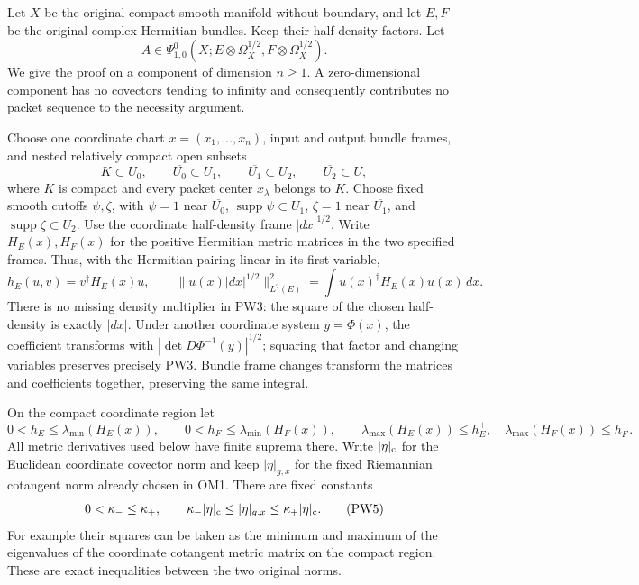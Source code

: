 \documentclass[
  11pt,
]{article}
\begin{document}
Let \(X\) be the original compact smooth manifold without boundary, and
let \(E,F\) be the original complex Hermitian bundles. Keep their
half-density factors. Let \[
 A\in\Psi^0_{1,0}
 (X;E\otimes\Omega_X^{1/2},F\otimes\Omega_X^{1/2}).
 \tag{PW1}
\] We give the proof on a component of dimension \(n\geq1\). A
zero-dimensional component has no covectors tending to infinity and
consequently contributes no packet sequence to the necessity argument.

Choose one coordinate chart \(x=(x_1,\ldots,x_n)\), input and output
bundle frames, and nested relatively compact open subsets \[
 K\subset U_0,\qquad
 \overline {U_0}\subset U_1,\qquad
 \overline {U_1}\subset U_2,\qquad
 \overline {U_2}\subset U ,
 \tag{PW2}
\] where \(K\) is compact and every packet center \(x_\lambda\) belongs
to \(K\). Choose fixed smooth cutoffs \(\psi,\zeta\), with \(\psi=1\)
near \(\overline {U_0}\), \(\operatorname{supp}\psi\subset
U_1\), \(\zeta=1\) near \(\overline {U_1}\), and
\(\operatorname{supp}\zeta\subset U_2\). Use the coordinate half-density
frame \(|dx|^{1/2}\). Write \(H_E(x),H_F(x)\) for the positive Hermitian
metric matrices in the two specified frames. Thus, with the Hermitian
pairing linear in its first variable, \[
 h_E(u,v)=v^\dagger H_E(x)u,\qquad
 \|u(x)|dx|^{1/2}\|_{L^2(E)}^2
       =\int u(x)^\dagger H_E(x)u(x)\,dx .
 \tag{PW3}
\] There is no missing density multiplier in PW3: the square of the
chosen half-density is exactly \(|dx|\). Under another coordinate system
\(y=\Phi(x)\), the coefficient transforms with
\(|\det D\Phi^{-1}(y)|^{1/2}\); squaring that factor and changing
variables preserves precisely PW3. Bundle frame changes transform the
matrices and coefficients together, preserving the same integral.

On the compact coordinate region let \[
 0<h_E^-\leq\lambda_{\min}(H_E(x)),\qquad
 0<h_F^-\leq\lambda_{\min}(H_F(x)),\qquad
 \lambda_{\max}(H_E(x))\leq h_E^+,\quad
 \lambda_{\max}(H_F(x))\leq h_F^+ .
 \tag{PW4}
\] All metric derivatives used below have finite suprema there. Write
\(|\eta|_{\rm c}\) for the Euclidean coordinate covector norm and keep
\(|\eta|_{g,x}\) for the fixed Riemannian cotangent norm already chosen
in OM1. There are fixed constants \[
 0<\kappa_-\leq\kappa_+,\qquad
 \kappa_-|\eta|_{\rm c}\leq|\eta|_{g,x}
       \leq\kappa_+|\eta|_{\rm c}.
 \tag{PW5}
\] For example their squares can be taken as the minimum and maximum of
the eigenvalues of the coordinate cotangent metric matrix on the compact
region. These are exact inequalities between the two original norms.
\end{document}
